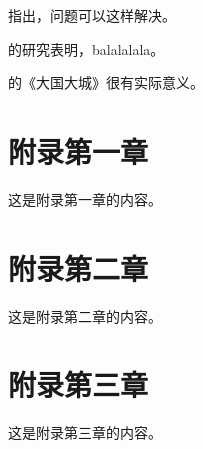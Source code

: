 \documentclass[UTF8,hyperref,space=auto]{ctexart} %
\theoremstyle{plain}
\theoremstyle{plain}
\theoremstyle{plain}
\theoremstyle{plain}
\theoremstyle{nonumberplain}
\begin{document}
\citet{JappelliPistaferri-433}指出，问题可以这样解决。

\citet{缪小林王婷-417}的研究表明，balalalala。

\citet{陆铭-455}的《大国大城》很有实际意义。


\nocite{*}


\appendix

\section{附录第一章}
这是附录第一章的内容。

\section{附录第二章}
这是附录第二章的内容。

\section{附录第三章}
这是附录第三章的内容。
\end{document}
